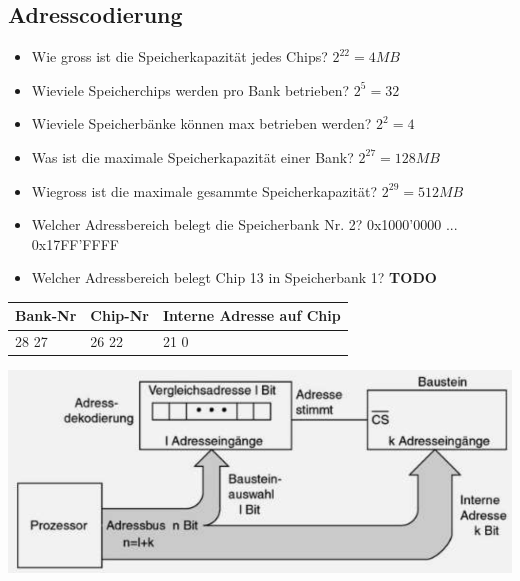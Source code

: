 \subsection{Adresscodierung}
\begin{minipage}{0.6\linewidth}
    \begin{itemize}
        \item Wie gross ist die Speicherkapazität jedes Chips?
        \subitem $ 2^{22}  = 4MB$
        \item Wieviele Speicherchips werden pro Bank betrieben?
        \subitem $ 2^5 =32$
        \item Wieviele Speicherbänke können max betrieben werden?
        \subitem $ 2^2=4 $
        \item Was ist die maximale Speicherkapazität einer Bank?
        \subitem $ 2^{27}=128MB $
        \item Wiegross ist die maximale gesammte Speicherkapazität?
        \subitem $ 2^{29}=512MB $    
        \item Welcher Adressbereich belegt die Speicherbank Nr. 2?
        \subitem 0x1000'0000 ... 0x17FF'FFFF
        \item Welcher Adressbereich belegt Chip 13 in Speicherbank 1?
        \subitem \textbf{TODO} %
    \end{itemize}
\end{minipage}
\begin{minipage}{0.4\linewidth}
        \begin{tabular}{|l|l|l|}
        \hline
        Bank-Nr         & Chip-Nr       & Interne Adresse auf Chip\\
        \hline
        28 \hfill 27    & 26 \hfill 22  & 21 \hfill 0\\
        \hline
    \end{tabular}
    \includegraphics[width=\textwidth]{images/SystembusSpeicherSpeichersystem/SpeicherSysAdressBus}
\end{minipage}

